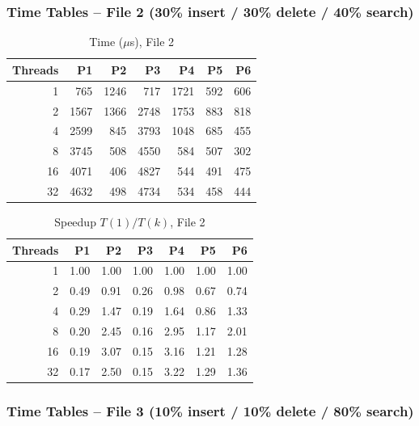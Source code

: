 \documentclass{article}
\begin{document}
\subsubsection{Time Tables -- File 2 (30\% insert / 30\% delete / 40\% search)}

\begin{table}[H]
\centering
\caption{Time ($\mu$s), File 2}
\begin{tabular}{r rrrrrr}
\toprule
Threads & P1 & P2 & P3 & P4 & P5 & P6 \\
\midrule
1  &  765 & 1246 &  717 & 1721 &  592 &  606 \\
2  & 1567 & 1366 & 2748 & 1753 &  883 &  818 \\
4  & 2599 &  845 & 3793 & 1048 &  685 &  455 \\
8  & 3745 &  508 & 4550 &  584 &  507 &  302 \\
16 & 4071 &  406 & 4827 &  544 &  491 &  475 \\
32 & 4632 &  498 & 4734 &  534 &  458 &  444 \\
\bottomrule
\end{tabular}
\end{table}

\begin{table}[H]
\centering
\caption{Speedup $T(1)/T(k)$, File 2}
\begin{tabular}{r rrrrrr}
\toprule
Threads & P1 & P2 & P3 & P4 & P5 & P6 \\
\midrule
1  & 1.00 & 1.00 & 1.00 & 1.00 & 1.00 & 1.00 \\
2  & 0.49 & 0.91 & 0.26 & 0.98 & 0.67 & 0.74 \\
4  & 0.29 & 1.47 & 0.19 & 1.64 & 0.86 & 1.33 \\
8  & 0.20 & 2.45 & 0.16 & 2.95 & 1.17 & 2.01 \\
16 & 0.19 & 3.07 & 0.15 & 3.16 & 1.21 & 1.28 \\
32 & 0.17 & 2.50 & 0.15 & 3.22 & 1.29 & 1.36 \\
\bottomrule
\end{tabular}
\end{table}

\subsubsection{Time Tables -- File 3 (10\% insert / 10\% delete / 80\% search)}
\end{document}
